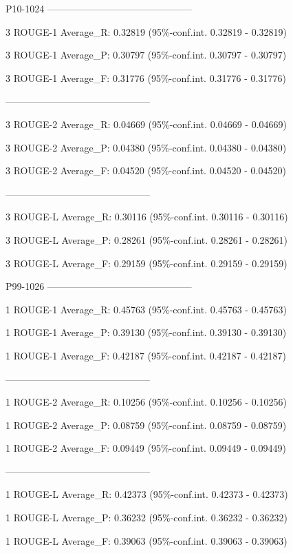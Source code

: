 \documentclass[hyp]{socreport}
\begin{document}
P10-1024
---------------------------------------------

3 ROUGE-1 Average\_R: 0.32819 (95\%-conf.int. 0.32819 - 0.32819)

3 ROUGE-1 Average\_P: 0.30797 (95\%-conf.int. 0.30797 - 0.30797)

3 ROUGE-1 Average\_F: 0.31776 (95\%-conf.int. 0.31776 - 0.31776)

---------------------------------------------

3 ROUGE-2 Average\_R: 0.04669 (95\%-conf.int. 0.04669 - 0.04669)

3 ROUGE-2 Average\_P: 0.04380 (95\%-conf.int. 0.04380 - 0.04380)

3 ROUGE-2 Average\_F: 0.04520 (95\%-conf.int. 0.04520 - 0.04520)

---------------------------------------------

3 ROUGE-L Average\_R: 0.30116 (95\%-conf.int. 0.30116 - 0.30116)

3 ROUGE-L Average\_P: 0.28261 (95\%-conf.int. 0.28261 - 0.28261)

3 ROUGE-L Average\_F: 0.29159 (95\%-conf.int. 0.29159 - 0.29159)



P99-1026
---------------------------------------------

1 ROUGE-1 Average\_R: 0.45763 (95\%-conf.int. 0.45763 - 0.45763)

1 ROUGE-1 Average\_P: 0.39130 (95\%-conf.int. 0.39130 - 0.39130)

1 ROUGE-1 Average\_F: 0.42187 (95\%-conf.int. 0.42187 - 0.42187)

---------------------------------------------

1 ROUGE-2 Average\_R: 0.10256 (95\%-conf.int. 0.10256 - 0.10256)

1 ROUGE-2 Average\_P: 0.08759 (95\%-conf.int. 0.08759 - 0.08759)

1 ROUGE-2 Average\_F: 0.09449 (95\%-conf.int. 0.09449 - 0.09449)

---------------------------------------------

1 ROUGE-L Average\_R: 0.42373 (95\%-conf.int. 0.42373 - 0.42373)

1 ROUGE-L Average\_P: 0.36232 (95\%-conf.int. 0.36232 - 0.36232)

1 ROUGE-L Average\_F: 0.39063 (95\%-conf.int. 0.39063 - 0.39063)
\end{document}
